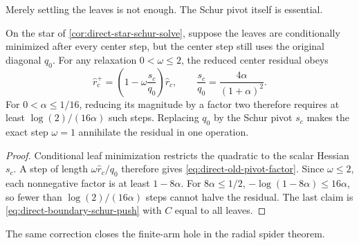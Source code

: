 Merely settling the leaves is not enough.  The Schur pivot itself is
essential.

\begin{proposition}
\label{prop:direct-old-pivot-slow}
On the star of \cref{cor:direct-star-schur-solve}, suppose the leaves are
conditionally minimized after every center step, but the center step still
uses the original diagonal $q_0$.  For any relaxation $0<\omega\leq2$, the
reduced center residual obeys
\begin{equation}
 \widehat r_c^+
 =\left(1-\omega\frac{s_c}{q_0}\right)\widehat r_c,
 \qquad
 \frac{s_c}{q_0}=\frac{4\alpha}{(1+\alpha)^2}.
 \label{eq:direct-old-pivot-factor}
\end{equation}
For $0<\alpha\leq1/16$, reducing its magnitude by a factor two therefore
requires at least $\log(2)/(16\alpha)$ such steps.  Replacing $q_0$ by the
Schur pivot $s_c$ makes the exact step $\omega=1$ annihilate the residual in
one operation.
\end{proposition}

\begin{proof}
Conditional leaf minimization restricts the quadratic to the scalar Hessian
$s_c$.  A step of length $\omega\widehat r_c/q_0$ therefore gives
\cref{eq:direct-old-pivot-factor}.  Since $\omega\leq2$, each nonnegative
factor is at least $1-8\alpha$.  For $8\alpha\leq1/2$,
$-\log(1-8\alpha)\leq16\alpha$, so fewer than
$\log(2)/(16\alpha)$ steps cannot halve the residual.  The last claim is
\cref{eq:direct-boundary-schur-push} with $C$ equal to all leaves.
\end{proof}

The same correction closes the finite-arm hole in the radial spider theorem.

